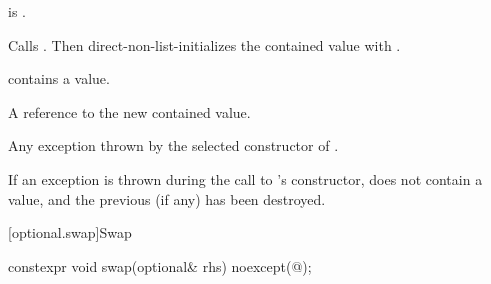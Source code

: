 \begin{itemdescr}
\pnum
\constraints
{} is .

\pnum
\effects
Calls . Then direct-non-list-initializes the contained value with
.

\pnum
\ensures
{} contains a value.

\pnum
\returns
A reference to the new contained value.

\pnum
\throws
Any exception thrown by the selected constructor of .

\pnum
\remarks
If an exception is thrown during the call to 's constructor,  does not contain a value, and the previous  (if any) has been destroyed.
\end{itemdescr}

[optional.swap]{Swap}

%
\begin{itemdecl}
constexpr void swap(optional& rhs) noexcept(@\seebelow@);
\end{itemdecl}

